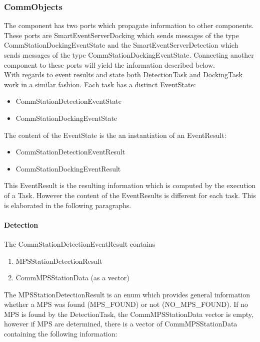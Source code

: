 \subsubsection{CommObjects}
The component has two ports which propagate information to other components. These ports are SmartEventServerDocking which sends messages of the type CommStationDockingEventState and the 
SmartEventServerDetection which sends messages of the type CommStationDockingEventState. Connecting another component to these ports will yield the information described below. 
\\
With regards to event results and state both DetectionTask and DockingTask work in a similar fashion. Each task has a distinct EventState:
\begin{itemize}
\item CommStationDetectionEventState
\item CommStationDockingEventState
\end{itemize}
The content of the EventState is the an instantiation of an EventResult:
\begin{itemize}
\item CommStationDetectionEventResult
\item CommStationDockingEventResult
\end{itemize}
This EventResult is the resulting information which is computed by the execution of a Task. However the content of the EventResults is different for each task. This is elaborated in the following paragraphs.

\paragraph{Detection}
The CommStationDetectionEventResult contains

\begin{enumerate}
\item MPSStationDetectionResult
\item CommMPSStationData (as a vector)
\end{enumerate}

The MPSStationDetectionResult is an enum which provides general information whether a MPS was found (MPS\_FOUND) or not (NO\_MPS\_FOUND).
If no MPS is found by the DetectionTask, the CommMPSStationData vector is empty, however if MPS are determined, there is a vector of CommMPSStationData containing the following information:


